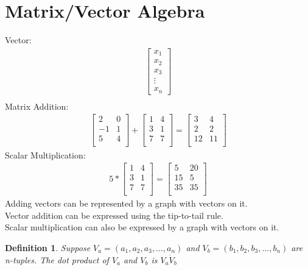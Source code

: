 \documentclass{report}
\newtheorem*{defn}{Definition}
\begin{document}
\section{Matrix/Vector Algebra}
Vector:
\begin{align*}
\begin{bmatrix}
x_1\\ x_2\\ x_3\\ \vdots \\ x_n
\end{bmatrix}\\
\end{align*}
Matrix Addition:
\begin{align*}
\begin{bmatrix}
2 & 0\\
-1 & 1\\
5 & 4\\
\end{bmatrix}
+
\begin{bmatrix}
1 & 4\\
3 & 1\\
7 & 7\\
\end{bmatrix}
=
\begin{bmatrix}
3 & 4\\
2 & 2\\
12 & 11\\
\end{bmatrix}
\end{align*}
Scalar Multiplication:
\begin{align*}
5 *
\begin{bmatrix}
1 & 4\\
3 & 1\\
7 & 7\\
\end{bmatrix}
=
\begin{bmatrix}
5 & 20\\
15 & 5\\
35 & 35\\
\end{bmatrix}
\end{align*}
Adding vectors can be represented by a graph with vectors on it.\\
Vector addition can be expressed using the tip-to-tail rule.\\
Scalar multiplication can also be expressed by a graph with vectors on it.\\

\begin{defn}
Suppose $V_a=(a_1,a_2,a_3,...,a_n)$ and $V_b = (b_1,b_2,b_3,...,b_n)$ are n-tuples. The dot product of $V_a$ and $V_b$ is $V_a \dot V_b$
\end{defn}
\end{document}

